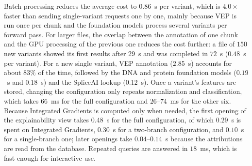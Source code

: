 Batch processing reduces the average cost to $0.86$~s per variant, which is $4.0\times$ faster than sending single-variant requests one by one, mainly because VEP is run once per chunk and the foundation models process several variants per forward pass. For larger files, the overlap between the annotation of one chunk and the GPU processing of the previous one reduces the cost further: a file of $150$ new variants showed its first results after $29$~s and was completed in $72$~s ($0.48$~s per variant). For a new single variant, VEP annotation ($2.85$~s) accounts for about $83\%$ of the time, followed by the DNA and protein foundation models ($0.19$~s and $0.18$~s) and the SpliceAI lookup ($0.12$~s). Once a variant's features are stored, changing the configuration only repeats normalization and classification, which takes $66$~ms for the full configuration and $26$--$74$~ms for the other six. Because Integrated Gradients is computed only when needed, the first opening of the explainability view takes $0.48$~s for the full configuration, of which $0.29$~s is spent on Integrated Gradients, $0.30$~s for a two-branch configuration, and $0.10$~s for a single-branch one; later openings take $0.04$--$0.14$~s because the attributions are read from the database. Repeated queries are answered in $18$~ms, which is fast enough for interactive use.
